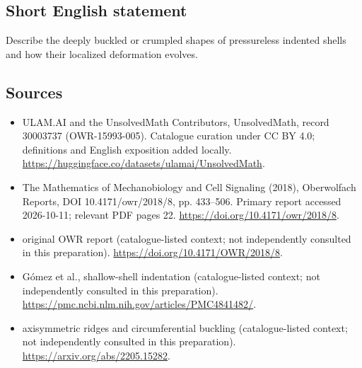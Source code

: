 \documentclass[11pt]{article}
\begin{document}
\subsection{Short English statement}
Describe the deeply buckled or crumpled shapes of pressureless indented shells and how their localized deformation evolves.
\subsection{Sources}
\begin{itemize}
\item[\hypertarget{source:30003737:1}{S1}] ULAM.AI and the UnsolvedMath Contributors, UnsolvedMath, record 30003737 (OWR-15993-005). Catalogue curation under CC BY 4.0; definitions and English exposition added locally.
\url{https://huggingface.co/datasets/ulamai/UnsolvedMath}.
\item[\hypertarget{source:30003737:2}{S2}] The Mathematics of Mechanobiology and Cell Signaling (2018), Oberwolfach Reports, DOI 10.4171/owr/2018/8, pp. 433--506. Primary report accessed 2026-10-11; relevant PDF pages 22.
\url{https://doi.org/10.4171/owr/2018/8}.
\item[\hypertarget{source:30003737:3}{S3}] original OWR report (catalogue-listed context; not independently consulted in this preparation).
\url{https://doi.org/10.4171/OWR/2018/8}.
\item[\hypertarget{source:30003737:4}{S4}] Gómez et al., shallow-shell indentation (catalogue-listed context; not independently consulted in this preparation).
\url{https://pmc.ncbi.nlm.nih.gov/articles/PMC4841482/}.
\item[\hypertarget{source:30003737:5}{S5}] axisymmetric ridges and circumferential buckling (catalogue-listed context; not independently consulted in this preparation).
\url{https://arxiv.org/abs/2205.15282}.
\end{itemize}
\label{end:30003737}
\end{document}
